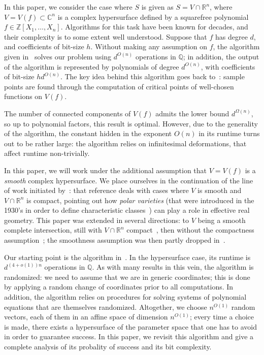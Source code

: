 \documentclass[sigconf]{acmart}
\def\C{\mathbb{C}}
\def\Q{\mathbb{Q}}
\def\R{\mathbb{R}}
\newcommand{\ZZ}{{\mathbb{Z}}}
\begin{document}
In this paper, we consider the case where $S$ is given as $S=V \cap
\R^n$, where $V=V(f) \subset \C^n$ is a complex hypersurface defined
by a squarefree polynomial $f \in \ZZ[X_1,\dots,X_n]$.
Algorithms for this task have been known for decades, and their
complexity is to some extent well understood. Suppose that $f$ has
degree $d$, and coefficients of bit-size $h$. Without making any
assumption on $f$, the algorithm given
in~\cite[Section~13.1]{BaPoRo03} solves our problem using $d^{O(n)}$
operations in $\Q$; in addition, the output of the algorithm is
represented by polynomials of degree $d^{O(n)}$, with coefficients of
bit-size $hd^{O(n)}$.  The key idea behind this algorithm goes back
to~\cite{GrVo88}: sample points are found through the computation of
critical points of well-chosen functions on $V(f)$.

The number of connected components of $V(f)$ admits the lower bound
$d^{\Omega(n)}$, so up to polynomial factors, this result is
optimal. However, due to the generality of the algorithm, the constant
hidden in the exponent $O(n)$ in its runtime turns out to be rather
large: the algorithm relies on infinitesimal deformations, that affect
runtime non-trivially.

In this paper, we will work under the additional assumption that
$V=V(f)$ is a {\em smooth} complex hypersurface. We place ourselves in
the continuation of the line of work initiated by~\cite{BaGiHeMb97}:
that reference deals with cases where $V$ is smooth and $V \cap \R^n$
is compact, pointing out how {\em polar varieties} (that were
introduced in the 1930's in order to define characteristic
classes~\cite{Piene78,Teissier88}) can play a role in effective real
geometry. This paper was extended in several directions: to $V$ being
a smooth complete intersection, still with $V\cap \R^n$
compact~\cite{BaGiHeMb01}, then without the compactness
assumption~\cite{EMP,BaGiHePa05}; the smoothness assumption was then partly
dropped in~\cite{BaGiHe14,BaGiHeLePa12}.

Our starting point is the algorithm in~\cite{EMP}. In the hypersurface
case, its runtime is $d^{(4+o(1))n}$ operations in $\Q$.  As with many
results in this vein, the algorithm is randomized: we need to assume
that we are in generic coordinates; this is done by applying a random
change of coordinates prior to all computations. In addition, the
algorithm relies on procedures for solving systems of polynomial
equations that are themselves randomized.  Altogether, we choose
$n^{O(1)}$ random vectors, each of them in an affine space of
dimension $n^{O(1)}$; every time a choice is made, there exists a
hypersurface of the parameter space that one has to avoid in order to
guarantee success. In this paper, we revisit this algorithm and give a
complete analysis of its probality of success and its bit complexity.
\end{document}
